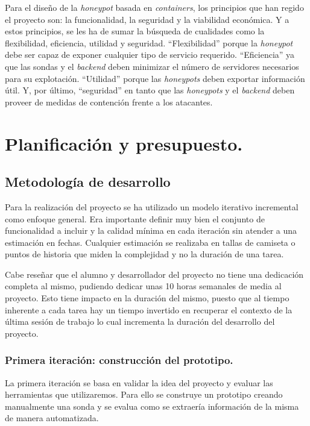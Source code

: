 Para el diseño de la \emph{honeypot} basada en \emph{containers}, los principios que han regido el proyecto son: la funcionalidad, la seguridad y la viabilidad económica. Y a estos principios, se les ha de sumar la búsqueda de cualidades como la flexibilidad, eficiencia, utilidad y seguridad. ``Flexibilidad'' porque la \emph{honeypot} debe ser capaz de exponer cualquier tipo de servicio requerido. ``Eficiencia'' ya que las sondas y el \emph{backend} deben minimizar el número de servidores necesarios para su explotación. ``Utilidad'' porque las \emph{honeypots} deben exportar información útil. Y, por último, ``seguridad''  en tanto que las \emph{honeypots} y el \emph{backend} deben proveer de medidas de contención frente a los atacantes.

\chapter{Planificación y presupuesto.}
\section{Metodología de desarrollo}

Para la realización del proyecto se ha utilizado un modelo iterativo incremental como enfoque general. Era importante definir
muy bien el conjunto de funcionalidad a incluir y la calidad mínima en cada iteración sin atender a una estimación en fechas. 
Cualquier estimación se realizaba en tallas de camiseta o puntos de historia que miden la complejidad y no la duración de una tarea.

Cabe reseñar que el alumno y desarrollador del proyecto no tiene una dedicación completa al mismo, pudiendo dedicar unas 10 horas semanales
de media al proyecto. Esto tiene impacto en la duración del mismo, puesto que al tiempo inherente a cada tarea hay un tiempo
invertido en recuperar el contexto de la última sesión de trabajo lo cual incrementa la duración del desarrollo del proyecto.


\subsection{Primera iteración: construcción del prototipo.}

La primera iteración se basa en validar la idea del proyecto y evaluar las herramientas que utilizaremos. Para ello se construye
un prototipo creando manualmente una sonda  y se evalua como se extraería información de la misma de manera automatizada.

